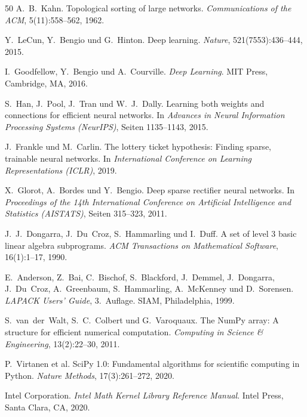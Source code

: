 \documentclass[a4paper,12pt]{report}
\theoremstyle{definition}
\begin{document}
\begin{thebibliography}{50}
A.~B.~Kahn.
\newblock Topological sorting of large networks.
\newblock \textit{Communications of the ACM}, 5(11):558--562, 1962.

Y.~LeCun, Y.~Bengio und G.~Hinton.
\newblock Deep learning.
\newblock \textit{Nature}, 521(7553):436--444, 2015.

I.~Goodfellow, Y.~Bengio und A.~Courville.
\newblock \textit{Deep Learning}.
\newblock MIT Press, Cambridge, MA, 2016.

S.~Han, J.~Pool, J.~Tran und W.~J.~Dally.
\newblock Learning both weights and connections for efficient neural networks.
\newblock In \textit{Advances in Neural Information Processing Systems (NeurIPS)}, Seiten 1135--1143, 2015.

J.~Frankle und M.~Carlin.
\newblock The lottery ticket hypothesis: Finding sparse, trainable neural networks.
\newblock In \textit{International Conference on Learning Representations (ICLR)}, 2019.

X.~Glorot, A.~Bordes und Y.~Bengio.
\newblock Deep sparse rectifier neural networks.
\newblock In \textit{Proceedings of the 14th International Conference on Artificial Intelligence and Statistics (AISTATS)}, Seiten 315--323, 2011.

J.~J.~Dongarra, J.~Du~Croz, S.~Hammarling und I.~Duff.
\newblock A set of level 3 basic linear algebra subprograms.
\newblock \textit{ACM Transactions on Mathematical Software}, 16(1):1--17, 1990.

E.~Anderson, Z.~Bai, C.~Bischof, S.~Blackford, J.~Demmel, J.~Dongarra, J.~Du~Croz, A.~Greenbaum, S.~Hammarling, A.~McKenney und D.~Sorensen.
\newblock \textit{LAPACK Users' Guide}, 3.~Auflage.
\newblock SIAM, Philadelphia, 1999.

S.~van~der~Walt, S.~C.~Colbert und G.~Varoquaux.
\newblock The NumPy array: A structure for efficient numerical computation.
\newblock \textit{Computing in Science \& Engineering}, 13(2):22--30, 2011.

P.~Virtanen et al.
\newblock SciPy 1.0: Fundamental algorithms for scientific computing in Python.
\newblock \textit{Nature Methods}, 17(3):261--272, 2020.

Intel Corporation.
\newblock \textit{Intel Math Kernel Library Reference Manual}.
\newblock Intel Press, Santa Clara, CA, 2020.


\end{thebibliography}
\end{document}
